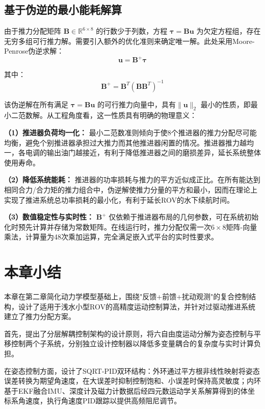 \subsection{基于伪逆的最小能耗解算}

由于推力分配矩阵 $\boldsymbol{B}\in\mathbb{R}^{6\times 8}$ 的行数少于列数，方程 $\boldsymbol{\tau}=\boldsymbol{B}\boldsymbol{u}$ 为欠定方程组，存在无穷多组可行推力解。需要引入额外的优化准则来确定唯一解。此处采用Moore-Penrose伪逆求解：
\begin{equation}
\boldsymbol{u} = \boldsymbol{B}^+ \boldsymbol{\tau}
\end{equation}

其中：
\begin{equation}
\boldsymbol{B}^+ = \boldsymbol{B}^T (\boldsymbol{B}\boldsymbol{B}^T)^{-1}
\end{equation}

该伪逆解在所有满足 $\boldsymbol{\tau}=\boldsymbol{B}\boldsymbol{u}$ 的可行推力向量中，具有$\|\boldsymbol{u}\|_2$ 最小的性质，即最小二范数解。从工程角度看，这一性质具有明确的物理意义：

\noindent\textbf{（1）推进器负荷均一化：} 最小二范数准则倾向于使8个推进器的推力分配尽可能均衡，避免个别推进器承担过大推力而其他推进器闲置的情况。推进器推力越均一，各电调的输出油门越接近，有利于降低推进器之间的磨损差异，延长系统整体使用寿命。

\noindent\textbf{（2）降低系统能耗：} 推进器的功率损耗与推力的平方近似成正比。在所有能达到相同合力/合力矩的推力组合中，伪逆解使推力分量的平方和最小，因而在理论上实现了推进系统总功率损耗的最小化，有利于延长ROV的水下续航时间。

\noindent\textbf{（3）数值稳定性与实时性：} $\boldsymbol{B}^+$ 仅依赖于推进器布局的几何参数，可在系统初始化时预先计算并存储为常数矩阵。在线运行时，推力分配仅需一次$6\times8$矩阵-向量乘法，计算量为48次乘加运算，完全满足嵌入式平台的实时性要求。

\section{本章小结}

本章在第二章简化动力学模型基础上，围绕"反馈+前馈+扰动观测"的复合控制结构，设计了适用于浅水小型ROV的高精度运动控制算法，并针对过驱动推进系统建立了推力分配方案。

首先，提出了分层解耦控制架构的设计原则，将六自由度运动分解为姿态控制与平移控制两个子系统，分别独立设计控制器以降低多变量耦合的复杂度与实时计算负担。

在姿态控制方面，设计了SQRT-PID双环结构：外环通过平方根非线性映射将姿态误差转换为期望角速度，在大误差时抑制控制饱和、小误差时保持高灵敏度；内环基于EKF融合IMU、深度计及磁力计数据后经四元数运动学关系解算得到的体坐标系角速度，执行角速度PID跟踪以提供高频阻尼调节。

